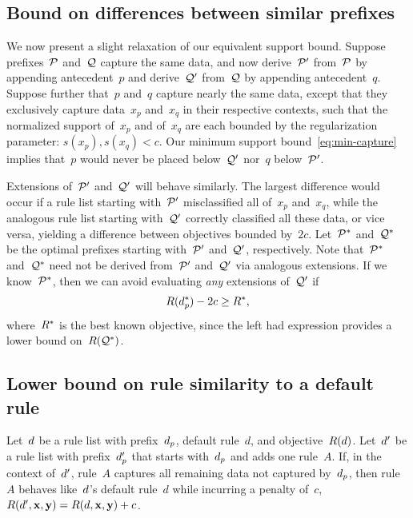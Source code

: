 \subsection{Bound on differences between similar prefixes}

We now present a slight relaxation of our equivalent support bound.
%
Suppose prefixes~$\cal P$ and~$\cal Q$ capture the same data,
and now derive~$\cal P'$ from~$\cal P$ by appending antecedent~$p$
and derive~$\cal Q'$ from~$\cal Q$ by appending antecedent~$q$.
%
Suppose further that~$p$ and~$q$ capture nearly the same data, except that
they exclusively capture data~$x_p$ and~$x_q$ in their respective contexts,
such that the normalized support of~$x_p$ and of~$x_q$ are each bounded by
the regularization parameter: ${s(x_p), s(x_q) < c}$.
%
Our minimum support bound~\eqref{eq:min-capture} implies
that~$p$ would never be placed below~$\cal Q'$ nor~$q$ below~$\cal P'$.

Extensions of~$\cal P'$ and~$\cal Q'$ will behave similarly.
%
The largest difference would occur if a rule list starting with~$\cal P'$
misclassified all of~$x_p$ and~$x_q$, while the analogous rule list starting
with~$\cal Q'$ correctly classified all these data, or vice versa,
yielding a difference between objectives bounded by~$2c$.
%
Let~$\cal P^*$ and~$\cal Q^*$ be the optimal prefixes
starting with~$\cal P'$ and~$\cal Q'$, respectively.
%
Note that~$\cal P^*$ and~$\cal Q^*$ need not be derived from~$\cal P'$ and~$\cal Q'$
via analogous extensions.
%
If we know~$\cal P^*$, then we can avoid evaluating \emph{any} extensions of~$\cal Q'$ if
\begin{align}
\Obj(\Prefix^*) - 2 c \ge \Obj^*,
\end{align}
where~$R^*$ is the best known objective, since the left had expression
provides a lower bound on~$R(\cal{Q}^*)$.



\subsection{Lower bound on rule similarity to a default rule}

Let~${d}$ be a rule list with prefix~$d_p$, default rule~$d$, and objective~$R({d})$.
%
Let~${d}'$ be a rule list with prefix~$d_p'$ that starts with~$d_p$ and adds one rule~$A$.
%
If, in the context of~${d}'$, rule~$A$ captures all remaining data not captured by~$d_p$,
then rule~$A$ behaves like~${d}$'s default rule~$d$ while incurring a penalty of~$c$,
\ie ~${R({d}', \mathbf{x}, \mathbf{y}) = R({d}, \mathbf{x}, \mathbf{y}) + c}$.

